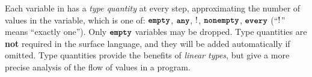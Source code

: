 \documentclass[nonacm, dvipsnames, usenames, sigconf]{acmart}
\begin{document}
Each variable in \langName has a \emph{type quantity} at every step, approximating the number of values in the variable, which is one of: $\textbf{\texttt{empty}}$, $\textbf{\texttt{any}}$, $!$, $\textbf{\texttt{nonempty}}$, $\textbf{\texttt{every}}$ (``$!$'' means ``exactly one'').
Only $\textbf{\texttt{empty}}$ \assetTxt variables may be dropped. %
Type quantities are \textbf{not} required in the surface language, and they will be added automatically if omitted. %
Type quantities provide the benefits of \emph{linear types}, but give a more precise analysis of the flow of values in a program.
\end{document}
